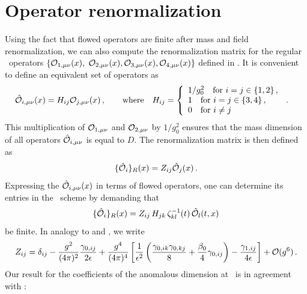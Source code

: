 \section{Operator renormalization}\label{sec:zij}

Using the fact that flowed operators are finite after mass and field
renormalization, we can also compute the renormalization matrix for the
regular \qcd\ operators $\{\mathcal{O}_{1,\mu\nu}(x),$ $\mathcal{O}_{2,\mu\nu}(x),
\mathcal{O}_{3,\mu\nu}(x), \mathcal{O}_{4,\mu\nu}(x) \}$ defined in . It
is convenient to define an equivalent set of operators as
\begin{equation}
  \begin{split}
    &\hat{\mathcal{O}}_{i,\mu\nu}(x) = H_{ij}\mathcal{O}_{j,\mu\nu} (x)\,,\qquad
    \mbox{where}\quad
    H_{ij} = \left\{\begin{array}{l}
    1/g_0^2\quad \text{for}\ i=j\in\{1,2\}\,,\\
    1\quad \text{for}\ i=j\in\{3,4\}\,,\\
    0\quad \text{for}\ i\neq j
    \end{array}\right.\,.
    \label{eq:opshat}
  \end{split}
\end{equation}
This multiplication of $\mathcal{O}_{1,\mu\nu}$ and $\mathcal{O}_{2,\mu\nu}$ by
$1/g_0^2$ ensures that the mass dimension of all operators
$\hat{\mathcal{O}}_{i,\mu\nu}$ is equal to $D$.  The renormalization matrix is
then defined as
\begin{equation}
	\{ \hat{\mathcal{O}}_i \}_R (x) = Z_{ij} \hat{\mathcal{O}}_j (x) \, .
\end{equation}
Expressing the $\hat{\mathcal{O}}_{i,\mu\nu} (x)$ in terms of flowed operators,
one can determine its entries in the \msbar\ scheme by demanding that
\begin{equation}
	 \{ \hat{\mathcal{O}}_i \}_R (x) = Z_{i j} \, H_{j k} \,
         \zeta_{k l}^{-1} (t) \, \tilde{\mathcal{O}}_l (t, x)
\end{equation}
be finite.  In analogy to  and , we write
\begin{equation}
	Z_{i j} = \delta_{i j} - \gcoup{2} \frac{\gamma_{0,
            i j}}{2 \ep} + \gcoup{4} \left[ \frac{1}{\ep^2}
          \left( \frac{\gamma_{0, i k} \gamma_{0, k j}}{8} +
          \frac{\beta_0}{4} \gamma_{0, i j} \right) - \frac{\gamma_{1, i
              j}}{4 \ep} \right] + \order{g^6}\,.
\end{equation}
Our result for the coefficients of the anomalous dimension at \nlo\ is
in agreement with :
